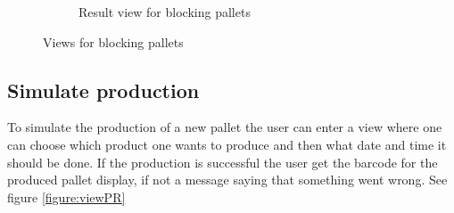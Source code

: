 \documentclass[a4paper]{scrartcl}
\numberwithin{equation}{section}
\begin{document}
\begin{figure}[h!]
\begin{subfigure}[b]{0.45\textwidth}
    	\label{figure:view_blockResult}
    	\caption{Result view for blocking pallets}
 		\end{subfigure} 
 		\caption{Views for blocking pallets}
    \label{figure:view_blocking}
\end{figure}

\subsection*{Simulate production}

To simulate the production of a new pallet the user can enter a view where one can choose which product one wants to produce and then what date and time it should be done. If the production is successful the user get the barcode for the produced pallet display, if not a message saying that something went wrong. See figure \ref{figure:viewPR}
\end{document}
